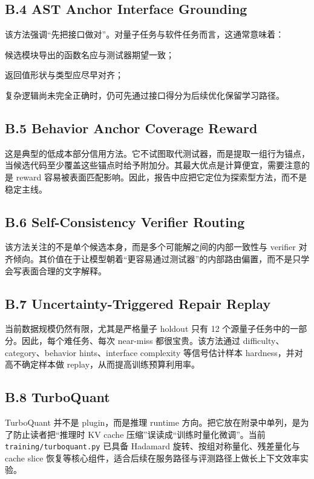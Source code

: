 \documentclass[11pt,a4paper]{article}
\newcommand{\code}[1]{\begingroup\ttfamily\footnotesize\nolinkurl{#1}\endgroup}
\begin{document}
\subsection{B.4 AST Anchor Interface Grounding}

该方法强调“先把接口做对”。对量子任务与软件任务而言，这通常意味着：

  \par 候选模块导出的函数名应与测试器期望一致；
  \par 返回值形状与类型应尽早对齐；
  \par 复杂逻辑尚未完全正确时，仍可先通过接口得分为后续优化保留学习路径。


\subsection{B.5 Behavior Anchor Coverage Reward}

这是典型的低成本部分信用方法。它不试图取代测试器，而是提取一组行为锚点，当候选代码至少覆盖这些锚点时给予附加分。其最大优点是计算便宜，需要注意的是 reward 容易被表面匹配影响。因此，报告中应把它定位为探索型方法，而不是稳定主线。

\subsection{B.6 Self-Consistency Verifier Routing}

该方法关注的不是单个候选本身，而是多个可能解之间的内部一致性与 verifier 对齐倾向。其价值在于让模型朝着“更容易通过测试器”的内部路由偏置，而不是只学会写表面合理的文字解释。

\subsection{B.7 Uncertainty-Triggered Repair Replay}

当前数据规模仍然有限，尤其是严格量子 holdout 只有 12 个源量子任务中的一部分。因此，每个难任务、每次 near-miss 都很宝贵。该方法通过 difficulty、category、behavior hints、interface complexity 等信号估计样本 hardness，并对高不确定样本做 replay，从而提高训练预算利用率。

\subsection{B.8 TurboQuant}

TurboQuant 并不是 plugin，而是推理 runtime 方向。把它放在附录中单列，是为了防止读者把“推理时 KV cache 压缩”误读成“训练时量化微调”。当前 \code{training/turboquant.py} 已具备 Hadamard 旋转、按组对称量化、残差量化与 cache slice 恢复等核心组件，适合后续在服务路径与评测路径上做长上下文效率实验。
\end{document}
